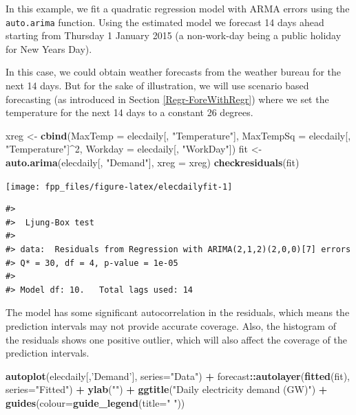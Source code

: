\documentclass[]{book}
\newenvironment{Shaded}{\begin{snugshade}}{\end{snugshade}}
\newcommand{\DataTypeTok}[1]{\textcolor[rgb]{0.13,0.29,0.53}{#1}}
\newcommand{\DecValTok}[1]{\textcolor[rgb]{0.00,0.00,0.81}{#1}}
\newcommand{\KeywordTok}[1]{\textcolor[rgb]{0.13,0.29,0.53}{\textbf{#1}}}
\newcommand{\NormalTok}[1]{#1}
\newcommand{\OperatorTok}[1]{\textcolor[rgb]{0.81,0.36,0.00}{\textbf{#1}}}
\newcommand{\StringTok}[1]{\textcolor[rgb]{0.31,0.60,0.02}{#1}}
\begin{document}
In this example, we fit a quadratic regression model with ARMA errors using the \texttt{auto.arima} function. Using the estimated model we forecast 14 days ahead starting from Thursday 1 January 2015 (a non-work-day being a public holiday for New Years Day).

In this case, we could obtain weather forecasts from the weather bureau for the next 14 days. But for the sake of illustration, we will use scenario based forecasting (as introduced in Section \ref{Regr-ForeWithRegr}) where we set the temperature for the next 14 days to a constant 26 degrees.

\begin{Shaded}
\begin{Highlighting}[]
\NormalTok{xreg <-}\StringTok{ }\KeywordTok{cbind}\NormalTok{(}\DataTypeTok{MaxTemp =}\NormalTok{ elecdaily[, }\StringTok{"Temperature"}\NormalTok{], }
              \DataTypeTok{MaxTempSq =}\NormalTok{ elecdaily[, }\StringTok{"Temperature"}\NormalTok{]}\OperatorTok{^}\DecValTok{2}\NormalTok{, }
              \DataTypeTok{Workday =}\NormalTok{ elecdaily[, }\StringTok{"WorkDay"}\NormalTok{])}
\NormalTok{fit <-}\StringTok{ }\KeywordTok{auto.arima}\NormalTok{(elecdaily[, }\StringTok{"Demand"}\NormalTok{], }\DataTypeTok{xreg =}\NormalTok{ xreg)}
\KeywordTok{checkresiduals}\NormalTok{(fit)}
\end{Highlighting}
\end{Shaded}

\begin{center}\texttt{[image: fpp\_files/figure-latex/elecdailyfit-1]} \end{center}

\begin{verbatim}
#> 
#>  Ljung-Box test
#> 
#> data:  Residuals from Regression with ARIMA(2,1,2)(2,0,0)[7] errors
#> Q* = 30, df = 4, p-value = 1e-05
#> 
#> Model df: 10.   Total lags used: 14
\end{verbatim}

The model has some significant autocorrelation in the residuals, which means the prediction intervals may not provide accurate coverage. Also, the histogram of the residuals shows one positive outlier, which will also affect the coverage of the prediction intervals.

\begin{Shaded}
\begin{Highlighting}[]
\KeywordTok{autoplot}\NormalTok{(elecdaily[,}\StringTok{'Demand'}\NormalTok{], }\DataTypeTok{series=}\StringTok{"Data"}\NormalTok{) }\OperatorTok{+}
\StringTok{  }\NormalTok{forecast}\OperatorTok{::}\KeywordTok{autolayer}\NormalTok{(}\KeywordTok{fitted}\NormalTok{(fit), }\DataTypeTok{series=}\StringTok{"Fitted"}\NormalTok{) }\OperatorTok{+}
\StringTok{  }\KeywordTok{ylab}\NormalTok{(}\StringTok{""}\NormalTok{) }\OperatorTok{+}
\StringTok{  }\KeywordTok{ggtitle}\NormalTok{(}\StringTok{"Daily electricity demand (GW)"}\NormalTok{) }\OperatorTok{+}
\StringTok{  }\KeywordTok{guides}\NormalTok{(}\DataTypeTok{colour=}\KeywordTok{guide_legend}\NormalTok{(}\DataTypeTok{title=}\StringTok{" "}\NormalTok{))}
\end{Highlighting}
\end{Shaded}
\end{document}
